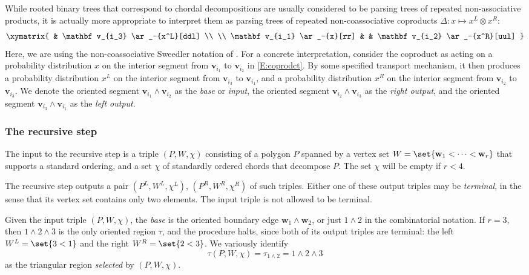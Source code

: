 \documentclass[12pt]{amsart}
\theoremstyle{plain}
\theoremstyle{definition}
\numberwithin{equation}{section}
\begin{document}
While rooted binary trees that correspond to chordal decompositions are usually considered to be parsing trees of repeated non-associative products, it is actually more appropriate to interpret them as parsing trees of repeated non-coassociative coproducts $\Delta\colon x\mapsto x^L\otimes x^R$:
\begin{equation}\label{E:coprodct}
\xymatrix{
&
\mathbf v_{i_3}
\ar
_-{x^L}[ddl]
\\
\\
\mathbf v_{i_1}
\ar
_-{x}[rr]
&
&
\mathbf v_{i_2}
\ar
_-{x^R}[uul]
}
\end{equation}
Here, we are using the non-coassociative Sweedler notation of \cite[Remark 2.2(b)]{Sm171}. For a concrete interpretation, consider the coproduct as acting on a probability distribution $x$ on the interior segment from $\mathbf v_{i_1}$ to $\mathbf v_{i_2}$ in \eqref{E:coprodct}. By some specified transport mechanism, it then produces a probability distribution $x^L$ on the interior segment from $\mathbf v_{i_3}$ to $\mathbf v_{i_1}$, and a probability distribution $x^R$ on the interior segment from $\mathbf v_{i_2}$ to $\mathbf v_{i_3}$. We denote the oriented segment $\mathbf v_{i_1}\wedge \mathbf v_{i_2}$ as the \emph{base} or \emph{input}, the oriented segment $\mathbf v_{i_2}\wedge \mathbf v_{i_3}$ as the \emph{right output}, and the oriented segment $\mathbf v_{i_3}\wedge \mathbf v_{i_1}$ as the \emph{left output}.


\subsubsection{The recursive step}


The input to the recursive step is a triple $(P,W,\chi)$ consisting of a polygon $P$ spanned by a vertex set $W=\set{\mathbf w_1<\dots<\mathbf w_r}$ that supports a standard ordering, and a set $\chi$ of standardly ordered chords that decompose $P$. The set $\chi$ will be empty if $r<4$.


The recursive step outputs a pair $(P^L,W^L,\chi^L)$,  $(P^R,W^R,\chi^R)$ of such triples. Either one of these output triples may be \emph{terminal}, in the sense that its vertex set contains only two elements. The input triple is not allowed to be terminal.



Given the input triple $(P,W,\chi)$, the \emph{base} is the oriented boundary edge $\mathbf w_1\wedge \mathbf w_2$, or just $1\wedge 2$ in the combinatorial notation. If $r=3$, then $1\wedge 2\wedge 3$ is the only oriented region $\tau$, and the procedure halts, since both of its output triples are terminal: the left $W^L=\set{3<1}$ and the right $W^R=\set{2<3}$. We variously identify
$$
\tau(P,W,\chi)=\tau_{1\wedge2}=1\wedge2\wedge3
$$
as the triangular region \emph{selected} by $(P,W,\chi)$.
\end{document}
